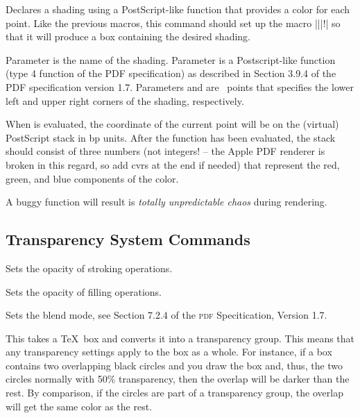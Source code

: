 \begin{command}{\pgfsys@functionalshading{}}
 Declares a shading using a PostScript-like function that provides a
 color for each point. Like the previous macros, this command
 should set up the macro |\@pgfshading||!| so that it will
 produce a box containing the desired shading.

 Parameter  is the name of the shading. Parameter
  is a
 Postscript-like function (type 4 function of the PDF specification)
 as described in Section 3.9.4 of the PDF specification version 1.7.
 Parameters  and  are
 \pgfname\ points that specifies the lower left and upper right
 corners of the shading, respectively.

 When  is evaluated, the coordinate of the current
 point will be on the (virtual) PostScript stack in bp units. After
 the function has been evaluated, the stack should consist of three
 numbers (not integers! -- the Apple PDF renderer is broken in this
 regard, so add cvrs at the end if needed) that represent the red,
 green, and blue components of the color.

 A buggy function will result is \emph{totally unpredictable chaos} during
 rendering.
\end{command}



\subsection{Transparency System Commands}

\begin{command}{\pgfsys@stroke@opacity{}}
  Sets the opacity of stroking operations.
\end{command}

\begin{command}{\pgfsys@fill@opacity{}}
  Sets the opacity of filling operations.
\end{command}

\begin{command}{\pgfsys@blend@mode{}}
  Sets the blend mode, see Section 7.2.4 of the \textsc{pdf}
  Specitication, Version 1.7.
\end{command}

\begin{command}{\pgfsys@transparencygroupfrombox{}}
  This takes a \TeX\ box and converts it into a transparency
  group. This means that any transparency settings apply to the box as
  a whole. For instance, if a box contains two overlapping black
  circles and you draw the box and, thus, the two circles normally
  with 50\% transparency, then the overlap will be darker than the
  rest. By comparison, if the circles are part of a transparency
  group, the overlap will get the same color as the rest.
\end{command}

